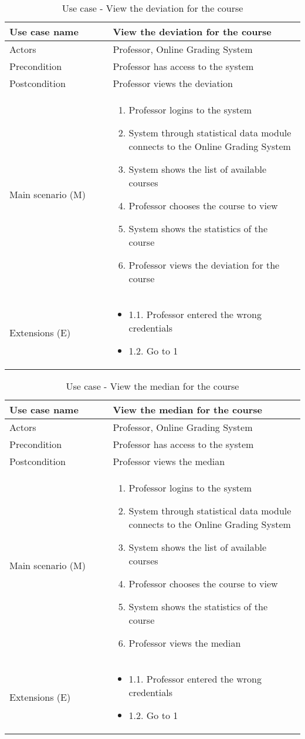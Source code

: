 \documentclass[12pt]{article}
\newcommand\tabularhead[1]{
\begin{table}[h]
  \caption{Use case - #1}
  \begin{tabular}{|p{0.35\linewidth}|p{0.65\linewidth}|}
    \hline
    \textbf{Use case name} & \textbf{#1} \\
    \hline}
\newcommand\addrow[2]{#1 &#2\\ \hline}
\newcommand\adddoublerow[2]{\begin{minipage}[t][][t]{2.5cm}#1\end{minipage}%
    &\begin{minipage}[t][][t]{\linewidth}
     \begin{itemize}\setlength{\itemsep}{0pt}%
        #2     
     \end{itemize}
     \end{minipage}\\ \hline}
\newcommand\addmulrow[2]{ \begin{minipage}[t][][t]{2.5cm}#1\end{minipage}%
     &\begin{minipage}[t][][t]{\linewidth}
      \begin{enumerate}\setlength{\itemsep}{0pt}%
        #2   
      \end{enumerate}
      \end{minipage}\\ \hline}
\newenvironment{usecase}{\tabularhead}
{\hline\end{tabular}\end{table}}
\begin{document}
\begin{usecase}{View the deviation for the course}
    \addrow{Actors}{Professor, Online Grading System}
    \addrow{Precondition}{Professor has access to the system}
    \addrow{Postcondition}{Professor views the deviation}
    \addmulrow{Main scenario (M)}{
        \item Professor logins to the system
        \item System through statistical data module connects to the Online Grading System
        \item System shows the list of available courses
        \item Professor chooses the course to view
        \item System shows the statistics of the course
        \item Professor views the deviation for the course
    }
    \adddoublerow{Extensions (E)}{
        \item[] 1.1. Professor entered the wrong credentials
        \item[] 1.2. Go to 1
    }
\end{usecase}
\newpage
\begin{usecase}{View the median for the course}
    \addrow{Actors}{Professor, Online Grading System}
    \addrow{Precondition}{Professor has access to the system}
    \addrow{Postcondition}{Professor views the median}
    \addmulrow{Main scenario (M)}{
        \item Professor logins to the system
        \item System through statistical data module connects to the Online Grading System
        \item System shows the list of available courses
        \item Professor chooses the course to view
        \item System shows the statistics of the course
        \item Professor views the median
    }
    \adddoublerow{Extensions (E)}{
        \item[] 1.1. Professor entered the wrong credentials
        \item[] 1.2. Go to 1
    }
\end{usecase}
\end{document}
